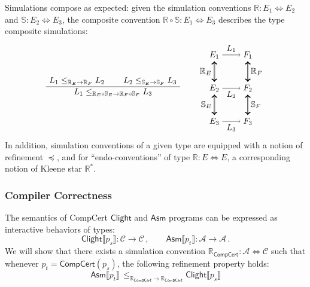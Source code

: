 \documentclass[sigplan,10pt,review,anonymous]{acmart}
\newcommand{\kw}[1]{\ensuremath{ \mathsf{#1} }}
\begin{document}
Simulations compose as expected:
given the simulation conventions
$\mathbb{R} : E_1 \Leftrightarrow E_2$ and
$\mathbb{S} : E_2 \Leftrightarrow E_3$,
the composite convention
$\mathbb{R} \circ \mathbb{S} : E_1 \Leftrightarrow E_3$
describes the type composite simulations:
\[
  \AxiomC{$L_1 \le_{\mathbb{R}_E \rightarrow \mathbb{R}_F} L_2$}
  \AxiomC{$L_2 \le_{\mathbb{S}_E \rightarrow \mathbb{S}_F} L_3$}
  \BinaryInfC{$L_1 \le_{\mathbb{R}_E \circ \mathbb{S}_E \rightarrow \mathbb{R}_F \circ \mathbb{S}_F} L_3$}
  \DisplayProof
  \qquad
  \begin{tikzpicture}[baseline,scale=0.7]
    \node (A1) at (-1,  2) {$E_1$};
    \node (A2) at (-1,  0) {$E_2$};
    \node (A3) at (-1, -2) {$E_3$};
    \node (B1) at ( 1,  2) {$F_1$};
    \node (B2) at ( 1,  0) {$F_2$};
    \node (B3) at ( 1, -2) {$F_3$};
    \draw (A1) edge[->] node[auto] {$L_1$} (B1);
    \draw (A2) edge[->] node[auto,swap] {$L_2$} (B2);
    \draw (A3) edge[->] node[auto,swap] {$L_3$} (B3);
    \draw (A1) edge[<->, double] node[auto,swap] {$\mathbb{R}_E$} (A2);
    \draw (B1) edge[<->, double] node[auto] {$\mathbb{R}_F$} (B2);
    \draw (A2) edge[<->, double] node[auto,swap] {$\mathbb{S}_E$} (A3);
    \draw (B2) edge[<->, double] node[auto] {$\mathbb{S}_F$} (B3);
  \end{tikzpicture}
\]
In addition,
simulation conventions of a given type
are equipped with a notion of refinement $\preceq$,
and for ``endo-conventions'' of type $\mathbb{R} : E \Leftrightarrow E$,
a corresponding notion of Kleene star $\mathbb{R}^*$.


\subsubsection{Compiler Correctness} \label{sec:compcert:overview} %

The semantics of CompCert $\kw{Clight}$ and $\kw{Asm}$ programs
can be expressed as interactive behaviors of types:
\[
    \kw{Clight} \llbracket p_s \rrbracket :
      \mathcal{C} \rightarrow \mathcal{C} \,, \qquad
    \kw{Asm} \llbracket p_t \rrbracket :
      \mathcal{A} \rightarrow \mathcal{A} \,.
\]
We will show that there exists a simulation convention
$\mathbb{R}_\kw{CompCert} : \mathcal{A} \Leftrightarrow \mathcal{C}$
such that whenever $p_t = \kw{CompCert}(p_s)$,
the following refinement property holds:
\begin{equation}
    \label{eqn:correctness}
    \kw{Asm} \llbracket p_t \rrbracket \,
    \le_{\mathbb{R}_\kw{CompCert} \rightarrow \mathbb{R}_\kw{CompCert}}
    \kw{Clight} \llbracket p_s \rrbracket
\end{equation}
\end{document}
